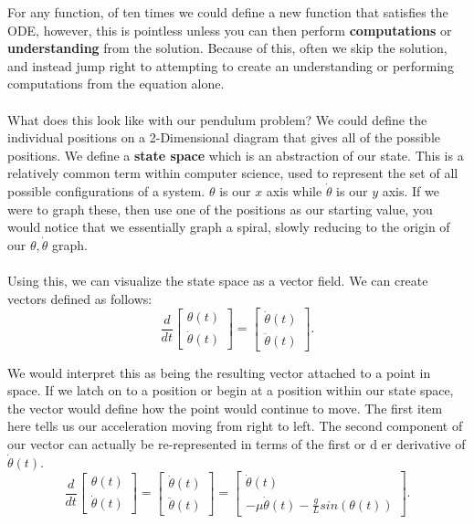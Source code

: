 \documentclass[10pt, oneside]{report}
\begin{document}
For any function, of ten times we could define a new function that satisfies the ODE, however, this is pointless unless you can then perform \textbf{computations} or \textbf{understanding} from the solution.  Because of this, often we skip the solution, and instead jump right to attempting to create an understanding or performing computations from the equation alone.  
\\
\\
What does this look like with our pendulum problem? We could define the individual positions on a 2-Dimensional diagram that gives all of the possible positions.  We define a \textbf{state space} which is an abstraction of our state.  This is a relatively common term within computer science, used to represent the set of all possible configurations of a system.  $\theta$ is our $x$ axis while $\dot{\theta}$ is our $y$ axis.  If we were to graph these, then use one of the positions as our starting value, you would notice that we essentially graph a spiral, slowly reducing to the origin of our $\theta, \dot{\theta}$ graph.  
\\
\\
Using this, we can visualize the state space as a vector field.  We can create vectors defined as follows:
\[
\frac{d}{dt} \begin{bmatrix}
    \theta(t) \\
    \dot{\theta}(t)
\end{bmatrix} = 
\begin{bmatrix}
    \dot{\theta}(t)\\
    \ddot{\theta}(t)
    
\end{bmatrix}
.\] 

We would interpret this as being the resulting vector attached to a point in space.  If we latch on to a position or begin at a position within our state space, the vector would define how the point would continue to move. 
The first item here tells us our acceleration moving from right to left. The second component of our vector can actually be re-represented in terms of the first or d er derivative of $\dot{\theta}(t)$.
\[
\frac{d}{dt} \begin{bmatrix}
    \theta(t) \\
    \dot{\theta}(t)
\end{bmatrix} = 
\begin{bmatrix}
    \dot{\theta}(t)\\
    \ddot{\theta}(t)
    
\end{bmatrix} = 
\begin{bmatrix}
    \dot{\theta}(t)\\
    -\mu\dot{\theta}(t) - \frac{g}{L} sin (\theta(t))
\end{bmatrix}
.\] 
\end{document}
